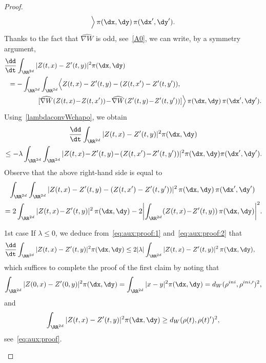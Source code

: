 \begin{proof}
\begin{equation*}
\begin{split}
\Bigr\rangle \, \pi(\dx,\dy) \, \pi(\dx',\dy').
\end{split}
\end{equation*}
Thanks to the fact that $\widehat{\nabla W}$ is odd, see~\eqref{A0}, we can write, by a symmetry argument,
\begin{equation*}
\begin{split}
&\frac{\dd}{\dt} \int_{\RR^{2d}} \vert Z(t,x) - Z'(t,y) \vert^2
\pi(\dx,\dy)
\\
&\;\; =-
\int_{\RR^{2d}}
\int_{\RR^{2d}}
\Bigl\langle Z(t,x) - Z'(t,y)- (Z(t,x') - Z'(t,y')
),
\\
&\qquad\qquad\quad
[
\widehat{\nabla W}(Z(t,x) \!-\! Z(t,x') ) \!-\!
\widehat{\nabla W}(Z'(t,y) \!-\! Z'(t,y') ) ]
\Bigr\rangle \, \pi(\dx,\dy) \, \pi(\dx',\dy').
\end{split}
\end{equation*}
Using~\eqref{lambdaconvWchapo}, we obtain
\begin{multline}\label{eq:aux:proof:1}
\frac{\dd}{\dt} \int_{\RR^{2d}}\vert Z(t,x) - Z'(t,y) \vert^2
\pi(\dx,\dy)
\\
\leq - \lambda
\int_{\RR^{2d}}
\int_{\RR^{2d}}
\vert Z(t,x) \!-\! Z'(t,y)\!-\! (Z(t,x') \!-\! Z'(t,y')
)
\vert^2 \pi(\dx,\dy) \pi(\dx',\dy').\!
\end{multline}
Observe that the above right-hand side is equal to
\begin{multline}\label{eq:aux:proof:2}
\!\int_{\RR^{2d}}
\int_{\RR^{2d}}
\vert Z(t,x) - Z'(t,y)- (Z(t,x') - Z'(t,y')
)
\vert^2 \, \pi(\dx,\dy) \, \pi(\dx',\dy')
\\
= 2 \int_{\RR^{2d}}
\vert Z(t,x) \!-\! Z'(t,y)
\vert^2 \, \pi(\dx,\dy) - 2 \biggl\vert
\int_{\RR^{2d}}
(Z(t,x) \!-\! Z'(t,y)
)
\, \pi(\dx,\dy) \biggr\vert^2.\!
\end{multline}

\begin{step}{1st case}
If $\lambda \leq 0$, we deduce from~\eqref{eq:aux:proof:1} and~\eqref{eq:aux:proof:2} that
\begin{equation*}
\begin{split}
&\frac{\dd}{\dt} \int_{\RR^{2d}}\vert Z(t,x) - Z'(t,y) \vert^2
\pi(\dx,\dy)
\leq 2 \vert \lambda \vert
\int_{\RR^{2d}}
\vert Z(t,x) - Z'(t,y)
\vert^2 \, \pi(\dx,\dy),
\end{split}
\end{equation*}
which suffices to complete the proof of the first claim by noting that
\begin{equation*}
\int_{\RR^{2d}}\vert Z(0,x) - Z'(0,y) \vert^2
\pi(\dx,\dy) =
\int_{\RR^{2d}}\vert x - y \vert^2
\pi(\dx,\dy) = d_{W}(\rho^{ini},\rho^{ini,\prime})^2,
\end{equation*}
and
\begin{equation*}
\int_{\RR^{2d}}\vert Z(t,x) - Z'(t,y) \vert^2
\pi(\dx,\dy) \geq d_{W}(\rho(t),\rho(t)^{\prime})^2,
\end{equation*}
see~\eqref{eq:aux:proof}.
\end{step}


\end{proof}

